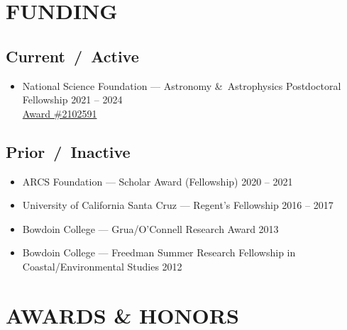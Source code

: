 \documentclass[10pt]{article}
\begin{document}

\section*{FUNDING}
\subsection*{\textbf{Current~/~Active}}
\begin{itemize}[leftmargin=0pt,label={},itemsep=1ex]
\item National Science Foundation --- Astronomy \&\ Astrophysics Postdoctoral Fellowship \hfill 2021 -- 2024 \\
\href{https://www.nsf.gov/awardsearch/showAward?AWD_ID=2102591&HistoricalAwards=false}{Award \#2102591}
\end{itemize}

\subsection*{\textbf{Prior~/~Inactive}}
\begin{itemize} [leftmargin=0pt,label={},itemsep=1ex]
\item ARCS Foundation --- Scholar Award (Fellowship) \hfill 2020 -- 2021
\item University of California Santa Cruz  --- Regent’s Fellowship \hfill 2016 – 2017
\item Bowdoin College --- Grua/O’Connell Research Award  \hfill 2013
\item Bowdoin College --- Freedman Summer Research Fellowship in Coastal/Environmental Studies \hfill 2012
\end{itemize}


\section*{AWARDS \& HONORS}
\end{document}
